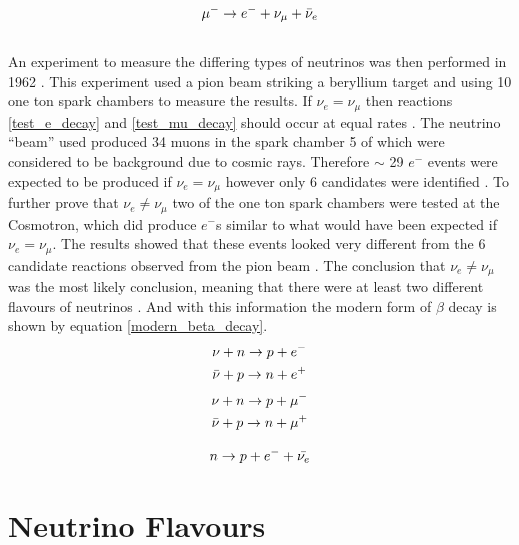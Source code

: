 \documentclass[12pt,a4paper]{article}
\begin{document}
\begin{equation}
    \mu^- \rightarrow e^- + \nu_\mu + \Bar{\nu}_e
    \label{proper_mu_decay}
\end{equation}
\\An experiment to measure the differing types of neutrinos was then performed in 1962 \cite{DanbyG1962PhysRevLett.9.36}. This experiment used a pion beam striking a beryllium target and using 10 one ton spark chambers to measure the results. If $\nu_e = \nu_\mu$ then reactions \ref{test_e_decay} and \ref{test_mu_decay} should occur at equal rates \cite{DanbyG1962PhysRevLett.9.36}. The neutrino ``beam'' used produced 34 muons in the spark chamber 5 of which were considered to be background due to cosmic rays. Therefore $\sim$ 29 $e^-$ events were expected to be produced if $\nu_e = \nu_\mu$ however only 6 candidates were identified \cite{DanbyG1962PhysRevLett.9.36}. To further prove that $\nu_e \not= \nu_\mu$ two of the one ton spark chambers were tested at the Cosmotron, which did produce $e^-$s similar to what would have been expected if $\nu_e = \nu_\mu$. The results showed that these events looked very different from the 6 candidate reactions observed from the pion beam \cite{DanbyG1962PhysRevLett.9.36}. The conclusion that $\nu_e \not= \nu_\mu$ was the most likely conclusion, meaning that there were at least two different flavours of neutrinos \cite{DanbyG1962PhysRevLett.9.36}. And with this information the modern form of $\beta$ decay is shown by equation \ref{modern_beta_decay}.
\begin{equation}
    \begin{split}
    \nu + n \rightarrow p + e^- \\
    \Bar{\nu} + p \rightarrow n + e^+
    \label{test_e_decay}
    \end{split}
\end{equation}
\begin{equation}
    \begin{split}
    \nu + n \rightarrow p + \mu^-  \\
    \Bar{\nu} + p \rightarrow n + \mu^+
    \label{test_mu_decay}
    \end{split}
\end{equation}

\begin{equation}
    n \rightarrow p + e^- + \Bar{\nu_e} 
    \label{modern_beta_decay}
\end{equation}

\section{Neutrino Flavours}
\end{document}
